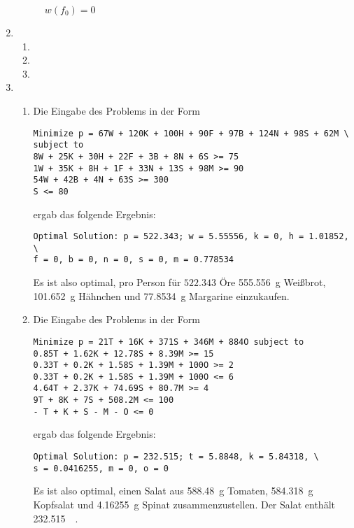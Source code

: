 \documentclass[a4paper]{scrartcl}
\begin{document}
\begin{enumerate}[label=\bfseries\arabic*.]
\begin{figure}[h]
\begin{tikzpicture}[
                auto,
                scale=4,
            ]
            \end{tikzpicture}
            \caption{$w(f_0) = 0$}
            \label{fig:ek0}
        \end{figure}

    \item
        \begin{enumerate}
            \item

            \item

            \item

        \end{enumerate}

    \item
        \begin{enumerate}
            \item
                Die Eingabe des Problems in der Form
                \begin{verbatim}
Minimize p = 67W + 120K + 100H + 90F + 97B + 124N + 98S + 62M \
subject to
8W + 25K + 30H + 22F + 3B + 8N + 6S >= 75
1W + 35K + 8H + 1F + 33N + 13S + 98M >= 90
54W + 42B + 4N + 63S >= 300
S <= 80 \end{verbatim}
                ergab das folgende Ergebnis:
                \begin{verbatim}
Optimal Solution: p = 522.343; w = 5.55556, k = 0, h = 1.01852, \
f = 0, b = 0, n = 0, s = 0, m = 0.778534 \end{verbatim}
                Es ist also optimal, pro Person für $522.343$ Öre
                \SI{555,556}{\gram} Weißbrot, \SI{101,652}{\gram} Hähnchen
                und \SI{77,8534}{\gram} Margarine einzukaufen.

            \item
                Die Eingabe des Problems in der Form
                \begin{verbatim}
Minimize p = 21T + 16K + 371S + 346M + 884O subject to
0.85T + 1.62K + 12.78S + 8.39M >= 15
0.33T + 0.2K + 1.58S + 1.39M + 100O >= 2
0.33T + 0.2K + 1.58S + 1.39M + 100O <= 6
4.64T + 2.37K + 74.69S + 80.7M >= 4
9T + 8K + 7S + 508.2M <= 100
- T + K + S - M - O <= 0 \end{verbatim}
                ergab das folgende Ergebnis:
                \begin{verbatim}
Optimal Solution: p = 232.515; t = 5.8848, k = 5.84318, \
s = 0.0416255, m = 0, o = 0 \end{verbatim}
                Es ist also optimal, einen Salat aus \SI{588,48}{\gram} Tomaten,
                \SI{584,318}{\gram} Kopfsalat und \SI{4,16255}{\gram} Spinat
                zusammenzustellen.
                Der Salat enthält \SI{232,515}{\kilo\calorie}.


\end{enumerate}
\end{enumerate}
\end{document}
